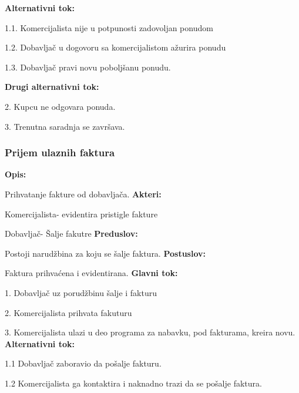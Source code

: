 \textbf{Alternativni tok:}

1.1. Komercijalista nije u potpunosti zadovoljan ponudom

1.2. Dobavljač u dogovoru sa komercijalistom ažurira ponudu

1.3. Dobavljač pravi novu poboljšanu ponudu.

\textbf{Drugi alternativni tok:}

2. Kupcu ne odgovara ponuda.

3. Trenutna saradnja se završava.


\subsubsection{Prijem ulaznih faktura}

\textbf{Opis:}

Prihvatanje fakture od dobavljača.
\newline
\textbf{Akteri:}

Komercijalista- evidentira pristigle fakture

Dobavljač- Šalje fakutre
\newline
\textbf{Preduslov:}

Postoji narudžbina za koju se šalje faktura.
\newline
\textbf{Postuslov:}

Faktura prihvaćena i evidentirana.
\newline
\textbf{Glavni tok:}

1. Dobavljač uz porudžbinu šalje i fakturu

2. Komercijalista prihvata fakuturu

3. Komercijalista ulazi u deo programa za nabavku, pod fakturama, kreira novu.
\newline
\textbf{Alternativni tok:}

1.1 Dobavljač zaboravio da pošalje fakturu.

1.2 Komercijalista ga kontaktira i naknadno trazi da se pošalje faktura.
\newline
\clearpage